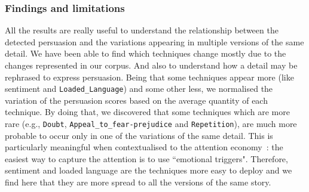 


\subsubsection{Findings and limitations}

All the results are really useful to understand the relationship between the detected persuasion and the variations appearing in multiple versions of the same detail.
We have been able to find which techniques change mostly due to the changes represented in our corpus. And also to understand how a detail may be rephrased to express persuasion.
Being that some techniques appear more (like 
 sentiment and \texttt{Loaded\_Language}) and some other less, we normalised the variation of the persuasion scores based on the average quantity of each technique.
 By doing that, we discovered that some techniques which are more rare (e.g., \texttt{Doubt}, \texttt{Appeal\_to\_fear-prejudice} and \texttt{Repetition}), are much more probable to occur only in one of the variations of the same detail.
This is particularly meaningful when contextualised to the attention economy~\citep{davenport2001attention}:
the easiest way to capture the attention is to use ``emotional triggers".
Therefore, sentiment and loaded language are the techniques more easy to deploy and we find here that they are more spread to all the versions of the same story.

